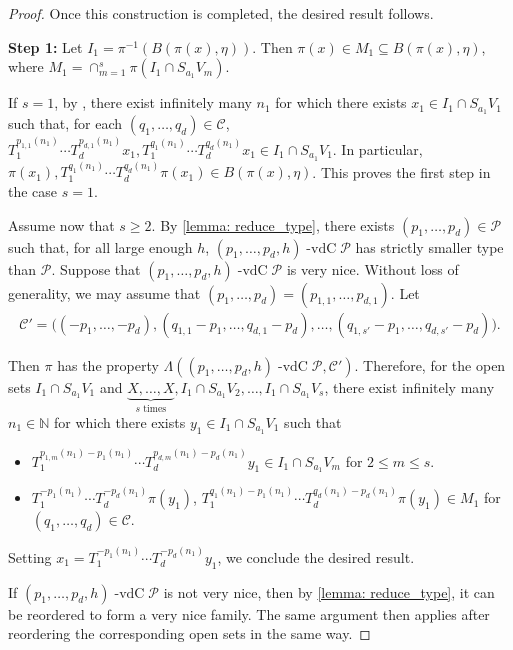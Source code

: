 \documentclass[11pt,reqno]{amsart}
\newcommand{\N}{\mathbb{N}}
\newcommand{\cC}{{\mathcal C}}
\newcommand{\cP}{{\mathcal P}}
\DeclareMathOperator{\vdc}{-vdC}
\theoremstyle{definition}
\theoremstyle{remark}
\begin{document}
\begin{proof}
Once this construction is completed, the desired result follows.

\textbf{Step 1:} Let $I_{1} = \pi^{-1} (B(\pi(x),\eta))$. Then $\pi(x) \in M_{1} \subseteq B(\pi(x),\eta)$, where $M_{1} = \cap_{m=1}^{s} \pi(I_{1}\cap S_{a_1}V_{m})$.

If $s=1$, by {\cite[Theorem C]{Bergelson_Leibman96}}, there exist infinitely many $n_1$ for which there exists $x_{1}\in I_{1}\cap S_{a_1}V_{1}$ such that, for each $(q_1,\dots,q_d)\in \cC$, $T_1^{p_{1,1}(n_1)}\cdots T_{d}^{p_{d,1}(n_1)}x_1,T_1^{q_1(n_1)}\cdots T_d^{q_d(n_1)}x_1\in I_{1}\cap S_{a_1}V_1$. In particular, $\pi(x_1),T_1^{q_1(n_1)}\cdots T_d^{q_d(n_1)}\pi(x_1)\in B(\pi(x),\eta)$. This proves the first step in the case $s=1$.

Assume now that $s\geq 2$. By \cref{lemma: reduce_type}, there exists $(p_1,\dots,p_d)\in \cP$ such that, for all large enough $h$, $(p_1,\dots,p_d,h)\vdc \cP$ has strictly smaller type than $\cP$. Suppose that $(p_1,\dots,p_d,h)\vdc \cP$ is very nice. Without loss of generality, we may assume that $(p_1,\dots,p_d)=(p_{1,1},\dots,p_{d,1})$. Let \begin{align*}
    \cC'=\big((-p_1,\dots,-p_d),(q_{1,1}-p_1,\dots,q_{d,1}-p_d),\dots,(q_{1,s'}-p_1,\dots,q_{d,s'}-p_d)\big).
\end{align*}

 Then $\pi$ has the property $\Lambda((p_1,\dots,p_d,h)\vdc \cP,\cC')$. Therefore, for the open sets $I_{1}\cap S_{a_{1}}V_{1}$ and  $\underbrace{X,\dots, X}_{s\text{ times}},I_{1}\cap S_{a_1}V_2,\dots,I_1 \cap S_{a_1} V_s$, there exist infinitely many $n_1\in \N$ for which there exists $y_1\in I_{1}\cap S_{a_1}V_1$ such that\begin{itemize}
    \item $T_1^{p_{1,m}(n_1)-p_1(n_1)}\cdots T_{d}^{p_{d,m}(n_1)-p_d(n_1)}y_1 \in I_{1}\cap S_{a_1}V_{m}$ for $2\leq m \leq s$.
    \item $T_1^{-p_1(n_1)}\cdots T_{d}^{-p_d(n_1)}\pi(y_1)$, $T_1^{q_1(n_1)-p_1(n_1)}\cdots T_d^{q_d(n_1)-p_d(n_1)}\pi(y_1)\in M_{1}$ for $(q_1,\dots,q_d)\in \cC$.
\end{itemize} 

Setting $x_{1} = T_1^{-p_1(n_1)}\cdots T_{d}^{-p_d(n_1)}y_1$, we conclude the desired result. 

If $(p_1,\dots,p_d,h)\vdc \cP$ is not very nice, then by \cref{lemma: reduce_type}, it can be reordered to form a very nice family. The same argument then applies after reordering the corresponding open sets in the same way.


\end{proof}
\end{document}
